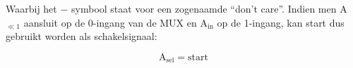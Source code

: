 \vspace{\textfloatsep}
\begin{minipage}{\linewidth}
	\begin{center}
	\end{center}
	\end{minipage}
\vspace{\textfloatsep}

Waarbij het $-$ symbool staat voor een zogenaamde ``don't care''. Indien men A$_{\ll 1}$ aansluit op de 0-ingang van de MUX en A$_{\text{in}}$ op de 1-ingang, kan start dus gebruikt worden als schakelsignaal:

\[ \text{A}_{\text{sel}} = \text{start} \]
